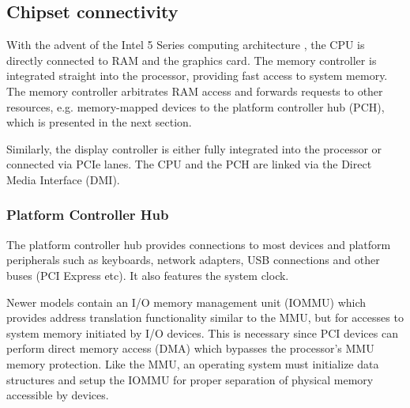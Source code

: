 \subsection{Chipset connectivity}
With the advent of the Intel 5 Series computing architecture
\cite{wiki:intel:5:series}, the CPU is directly connected to RAM and
the graphics card. The memory controller is integrated straight into the
processor, providing fast access to system memory. The memory controller
arbitrates RAM access and forwards requests to other resources, e.g.
memory-mapped devices to the platform controller hub (PCH), which is presented
in the next section.

Similarly, the display controller is either fully integrated into the processor
or connected via PCIe lanes. The CPU and the PCH are linked via the Direct
Media Interface (DMI).

\subsubsection{Platform Controller Hub}
The platform controller hub provides connections to most devices and
platform peripherals such as keyboards, network adapters, USB connections and
other buses (PCI Express etc). It also features the system clock.

Newer models contain an I/O memory management unit (IOMMU) which
provides address translation functionality similar to the MMU, but for accesses
to system memory initiated by I/O devices.  This is necessary since PCI devices
can perform direct memory access (DMA) which bypasses the processor's
MMU memory protection. Like the MMU, an operating system must initialize data
structures and setup the IOMMU for proper separation of physical memory
accessible by devices.
